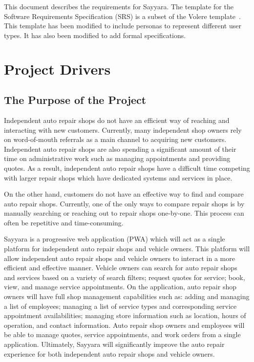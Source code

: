 \documentclass[12pt]{article}
\begin{document}
This document describes the requirements for Sayyara. The template for the Software Requirements
Specification (SRS) is a subset of the Volere template~\citep{RobertsonAndRobertson2012}. This
template has been modified to include personas to represent different user types. It has also been
modified to add formal specifications.

\section{Project Drivers}

\subsection{The Purpose of the Project}

Independent auto repair shops do not have an efficient way of reaching and interacting with new
customers. Currently, many independent shop owners rely on word-of-mouth referrals as a main
channel to acquiring new customers. Independent auto repair shops are also spending a significant
amount of their time on administrative work such as managing appointments and providing quotes. As
a result, independent auto repair shops have a difficult time competing with larger repair shops
which have dedicated systems and services in place.

On the other hand, customers do not have an effective way to find and compare auto repair shops.
Currently, one of the only ways to compare repair shops is by manually searching or reaching out to
repair shops one-by-one. This process can often be repetitive and time-consuming.

Sayyara is a progressive web application (PWA) which will act as a single platform for independent
auto repair shops and vehicle owners. This platform will allow independent auto repair shops and
vehicle owners to interact in a more efficient and effective manner. Vehicle owners can search for
auto repair shops and services based on a variety of search filters; request quotes for service;
book, view, and manage service appointments. On the application, auto repair shop owners will have
full shop management capabilities such as: adding and managing a list of employees; managing a list
of service types and corresponding service appointment availabilities; managing store information
such as location, hours of operation, and contact information. Auto repair shop owners and
employees will be able to manage quotes, service appointments, and work orders from a single
application. Ultimately, Sayyara will significantly improve the auto repair experience for both
independent auto repair shops and vehicle owners.
\end{document}
